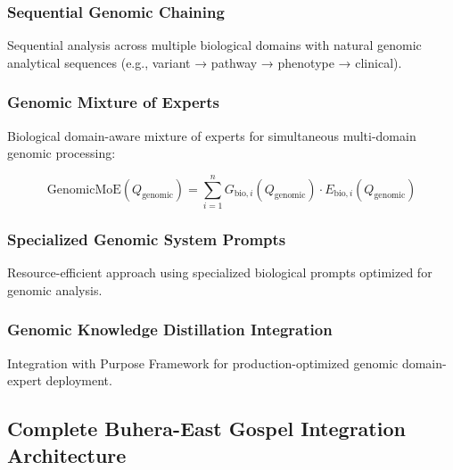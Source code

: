 \documentclass[12pt,a4paper]{article}
\begin{document}
\subsubsection{Sequential Genomic Chaining}

Sequential analysis across multiple biological domains with natural genomic analytical sequences (e.g., variant → pathway → phenotype → clinical).

\subsubsection{Genomic Mixture of Experts}

Biological domain-aware mixture of experts for simultaneous multi-domain genomic processing:

\begin{equation}
\text{GenomicMoE}(Q_{\text{genomic}}) = \sum_{i=1}^n G_{\text{bio},i}(Q_{\text{genomic}}) \cdot E_{\text{bio},i}(Q_{\text{genomic}})
\end{equation}

\subsubsection{Specialized Genomic System Prompts}

Resource-efficient approach using specialized biological prompts optimized for genomic analysis.

\subsubsection{Genomic Knowledge Distillation Integration}

Integration with Purpose Framework for production-optimized genomic domain-expert deployment.

\subsection{Complete Buhera-East Gospel Integration Architecture}
\end{document}
